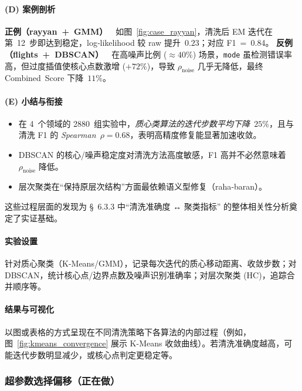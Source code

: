 \documentclass[10pt]{article} %
\numberwithin{equation}{section}
\begin{document}
\paragraph{(D) 案例剖析}

\noindent
\textbf{正例（rayyan + GMM）} 如图 \ref{fig:case_rayyan}，清洗后 EM 迭代在第 12 步即达到稳定，log‑likelihood 较 raw 提升 $0.23$；对应 F1 = 0.84。  
\textbf{反例（flights + DBSCAN）} 在高噪声比例 ($\approx40\%$) 场景，\texttt{mode} 虽检测错误率高，但过度插值使核心点数激增 ($+72\%$)，导致 $\rho_{\text{noise}}$ 几乎无降低，最终 Combined Score 下降 $11\%$。

\paragraph{(E) 小结与衔接}
\begin{itemize}
  \item 在 4 个领域的 2880 组实验中，\emph{质心类算法的迭代步数平均下降 $25\%$}，且与清洗 F1 的 \emph{Spearman $\rho=0.68$}，表明高精度修复能显著加速收敛。  
  \item DBSCAN 的核心/噪声稳定度对清洗方法高度敏感，F1 高并不必然意味着 $\rho_{\text{noise}}$ 降低。  
  \item 层次聚类在“保持原层次结构”方面最依赖语义型修复（raha‑baran）。  
\end{itemize}
这些过程层面的发现为 § 6.3.3 中“清洗准确度 ↔ 聚类指标” 的整体相关性分析奠定了实证基础。

\paragraph{实验设置}
针对质心聚类（K-Means/GMM），记录每次迭代的质心移动距离、收敛步数；对 DBSCAN，统计核心点/边界点数及噪声识别准确率；对层次聚类 (HC)，追踪合并顺序等。

\paragraph{结果与可视化}
以图或表格的方式呈现在不同清洗策略下各算法的内部过程（例如，图~\ref{fig:kmeans_convergence} 展示 K-Means 收敛曲线）。若清洗准确度越高，可能迭代步数明显减少，或核心点判定更稳定等。

\subsubsection{超参数选择偏移（正在做）}
\label{subsec:param_shift}
\end{document}
